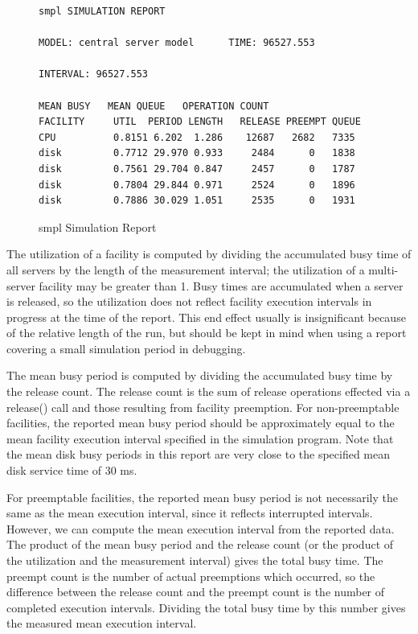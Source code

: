 \begin{figure}[H]
\centering
\begingroup\small
\begin{verbatim}
smpl SIMULATION REPORT

MODEL: central server model      TIME: 96527.553

INTERVAL: 96527.553

MEAN BUSY   MEAN QUEUE   OPERATION COUNT
FACILITY     UTIL  PERIOD LENGTH   RELEASE PREEMPT QUEUE
CPU          0.8151 6.202  1.286    12687   2682   7335
disk         0.7712 29.970 0.933     2484      0   1838
disk         0.7561 29.704 0.847     2457      0   1787
disk         0.7804 29.844 0.971     2524      0   1896
disk         0.7886 30.029 1.051     2535      0   1931
\end{verbatim}
\endgroup
\caption{smpl Simulation Report}
\end{figure}

The utilization of a facility is computed by dividing the accumulated busy
time of all servers by the length of the measurement interval; the
utilization of a multi-server facility may be greater than 1. Busy times are
accumulated when a server is released, so the utilization does not reflect
facility execution intervals in progress at the time of the report. This end
effect usually is insignificant because of the relative length of the run, but
should be kept in mind when using a report covering a small simulation period
in debugging.

The mean busy period is computed by dividing the accumulated busy time by the
release count. The release count is the sum of release operations effected via
a release() call and those resulting from facility preemption. For
non-preemptable facilities, the reported mean busy period should be
approximately equal to the mean facility execution interval specified in the
simulation program. Note that the mean disk busy periods in this report are
very close to the specified mean disk service time of 30 ms.

For preemptable facilities, the reported mean busy period is not necessarily
 the same as the mean execution interval, since it reflects interrupted
intervals. However, we can compute the mean execution interval from the
reported data. The product of the mean busy period and the release count (or
 the product of the utilization and the measurement interval) gives the total
busy time. The preempt count is the number of actual preemptions which
occurred, so the difference between the release count and the preempt count
is the number of completed execution intervals. Dividing the total busy time by
this number gives the measured mean execution interval.

